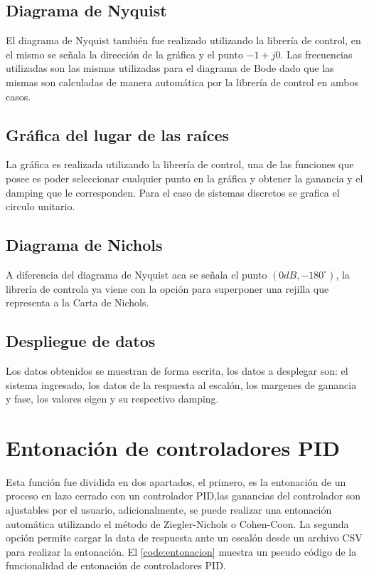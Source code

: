     \subsection{Diagrama de Nyquist}
        
        El diagrama de Nyquist también fue realizado utilizando la librería de control, en el mismo se señala la dirección de la gráfica y el punto $-1 + j0$. Las frecuencias utilizadas son las mismas utilizadas para el diagrama de Bode dado que las mismas son calculadas de manera automática por la librería de control en ambos casos.
    
    \subsection{Gráfica del lugar de las raíces}
        
        La gráfica es realizada utilizando la librería de control, una de las funciones que posee es poder seleccionar cualquier punto en la gráfica y obtener la ganancia y el damping que le corresponden. Para el caso de sistemas discretos se grafica el circulo unitario.
    
    \subsection{Diagrama de Nichols}
        
        A diferencia del diagrama de Nyquist aca se señala el punto $(0dB, -180^\circ)$, la librería de controla ya viene con la opción para superponer una rejilla que representa a la Carta de Nichols.

    \subsection{Despliegue de datos}
        
        Los datos obtenidos se muestran de forma escrita, los datos a desplegar son: el sistema ingresado, los datos de la respuesta al escalón, los margenes de ganancia y fase, los valores eigen y su respectivo damping.

\section{Entonación de controladores PID}

    Esta función fue dividida en dos apartados, el primero, es la entonación de un proceso en lazo cerrado con un controlador PID,las ganancias del controlador son ajustables por el usuario, adicionalmente, se puede realizar una entonación automática utilizando el método de Ziegler-Nichols o Cohen-Coon. La segunda opción permite cargar la data de respuesta ante un escalón desde un archivo CSV para realizar la entonación. El \cref{code:entonacion} muestra un pseudo código de la funcionalidad de entonación de controladores PID.
    
